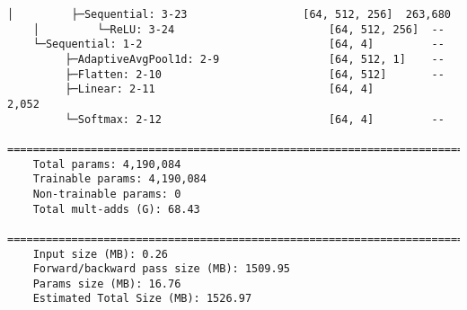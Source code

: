 \begin{lstlisting}[caption=\acrfull{resnet18}]
    │         ├─Sequential: 3-23                  [64, 512, 256]  263,680
    │         └─ReLU: 3-24                        [64, 512, 256]  --
    └─Sequential: 1-2                             [64, 4]         --
         ├─AdaptiveAvgPool1d: 2-9                 [64, 512, 1]    --
         ├─Flatten: 2-10                          [64, 512]       --
         ├─Linear: 2-11                           [64, 4]         2,052
         └─Softmax: 2-12                          [64, 4]         --
    ===========================================================================
    Total params: 4,190,084
    Trainable params: 4,190,084
    Non-trainable params: 0
    Total mult-adds (G): 68.43
    ===========================================================================
    Input size (MB): 0.26
    Forward/backward pass size (MB): 1509.95
    Params size (MB): 16.76
    Estimated Total Size (MB): 1526.97
\end{lstlisting}